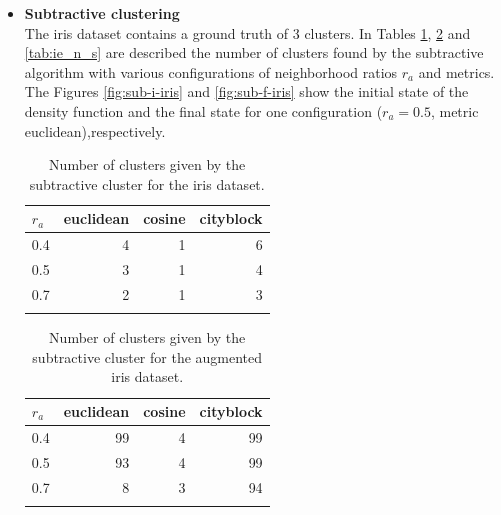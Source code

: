 \documentclass[conference]{IEEEtran}
\begin{document}
\begin{itemize}
    \item \textbf{Subtractive clustering}\\
    The iris dataset contains a ground truth of 3 clusters. In Tables \ref{tab:i1_n_s}, \ref{tab:i2_n_s} and \ref{tab:ie_n_s} are described the number of clusters found by the subtractive algorithm with various configurations of neighborhood ratios $r_a$ and metrics. The Figures \ref{fig:sub-i-iris} and \ref{fig:sub-f-iris} show the initial state of the density function and the final state for one configuration ($r_a =0.5$, metric euclidean),respectively.
    \begin{table}[ht!]
        \centering
        \begin{tabular}{lrrr}
        \toprule
        $r_a$ &  euclidean &  cosine &  cityblock \\
        \midrule
        0.4 &          4 &       1 &          6 \\
        0.5 &          3 &       1 &          4 \\
        0.7 &          2 &       1 &          3 \\
        \bottomrule \\
\end{tabular}
        \caption{Number of clusters given by the subtractive cluster for the iris dataset.}
        \label{tab:i1_n_s}
    \end{table}
    \begin{table}[ht!]
        \centering
        \begin{tabular}{lrrr}
        \toprule
        $r_a$ &  euclidean &  cosine &  cityblock \\
        \midrule
        0.4 &         99 &       4 &         99 \\
        0.5 &         93 &       4 &         99 \\
        0.7 &          8 &       3 &         94 \\
        \bottomrule \\
        \end{tabular}
        \caption{Number of clusters given by the subtractive cluster for the augmented iris dataset.}
        \label{tab:i2_n_s}
    \end{table}
    

\end{itemize}
\end{document}
